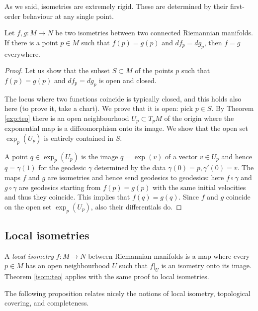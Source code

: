 As we said, isometries are extremely rigid. These are determined by their first-order behaviour at any single point.

\begin{teo} \label{isom:teo}
Let $f,g\colon M \to N$ be two isometries between two connected Riemannian manifolds. If there is a point $p\in M$ such that $f(p) = g(p)$ and $df_p = dg_p$, then $f  =g$ everywhere.
\end{teo}
\begin{proof}
Let us show that the subset $S\subset M$ of the points $p$ such that $f(p) = g(p)$ and $df_p = dg_p$ is open and closed.

The locus where two functions coincide is typically closed, and this holds also here (to prove it, take a chart). We prove that it is open: pick $p\in S$. 
By Theorem \ref{exp:teo} there is an open neighbourhood $U_p \subset T_pM$ of the origin where the exponential map is a diffeomorphism onto its image. We show that the open set $\exp_p(U_p)$ is entirely contained in $S$.

A point $q\in\exp_p(U_p)$ is the image $q=\exp(v)$ of a vector $v\in U_p$ and hence $q=\gamma(1)$ for the geodesic $\gamma$ determined by the data $\gamma(0)=p, \gamma'(0)=v$. The maps $f$ and $g$ are isometries and hence send geodesics to geodesics: here $f\circ \gamma$ and $g\circ\gamma$ are geodesics starting from $f(p)=g(p)$ with the same initial velocities and thus they coincide. This implies that $f(q)=g(q)$. Since $f$ and $g$ coincide on the open set $\exp_p(U_p)$, also their differentials do.
\end{proof}


\subsection{Local isometries}
A \emph{local isometry} $f\colon M \to N$ between Riemannian manifolds is a map where every $p\in M$ has an open neighbourhood $U$ such that $f|_U$ is an isometry onto its image. Theorem \ref{isom:teo} applies with the same proof to local isometries.

The following proposition relates nicely the notions of local isometry, topological covering, and completeness.

